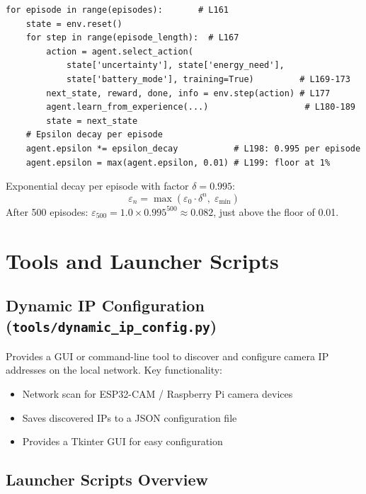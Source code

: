 \documentclass[12pt,a4paper,twoside]{report}
\theoremstyle{definition}
\begin{document}
\begin{lstlisting}
for episode in range(episodes):       # L161
    state = env.reset()
    for step in range(episode_length):  # L167
        action = agent.select_action(
            state['uncertainty'], state['energy_need'],
            state['battery_mode'], training=True)         # L169-173
        next_state, reward, done, info = env.step(action) # L177
        agent.learn_from_experience(...)                   # L180-189
        state = next_state
    # Epsilon decay per episode
    agent.epsilon *= epsilon_decay           # L198: 0.995 per episode
    agent.epsilon = max(agent.epsilon, 0.01) # L199: floor at 1%
\end{lstlisting}

\begin{mathbox}
Exponential decay per episode with factor $\delta = 0.995$:
\[
  \varepsilon_n = \max\!\left(\varepsilon_0 \cdot \delta^n,\; \varepsilon_{\min}\right)
\]
After 500 episodes: $\varepsilon_{500} = 1.0 \times 0.995^{500} \approx 0.082$,
just above the floor of 0.01.
\end{mathbox}

\chapter{Tools and Launcher Scripts}

\section{Dynamic IP Configuration (\texttt{tools/dynamic\_ip\_config.py})}

Provides a GUI or command-line tool to discover and configure camera IP
addresses on the local network. Key functionality:
\begin{itemize}
  \item Network scan for ESP32-CAM / Raspberry Pi camera devices
  \item Saves discovered IPs to a JSON configuration file
  \item Provides a Tkinter GUI for easy configuration
\end{itemize}

\section{Launcher Scripts Overview}
\end{document}
